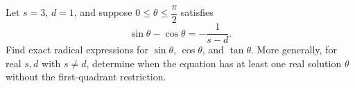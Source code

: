 Let $s=3$, $d=1$, and suppose $0\le\theta\le\dfrac{\pi}{2}$ satisfies
\[
\sin\theta-\cos\theta=-\dfrac{1}{s-d}.
\]
Find exact radical expressions for $\sin\theta$, $\cos\theta$, and $\tan\theta$. More generally, for real $s,d$ with $s\ne d$, determine when the equation has at least one real solution $\theta$ without the first-quadrant restriction.
